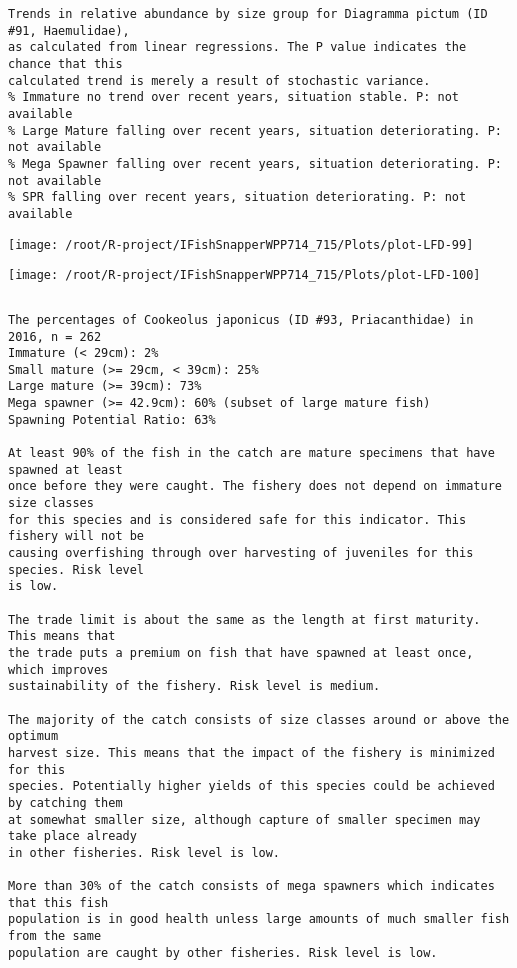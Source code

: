 \documentclass{report}\usepackage[]{graphicx}\usepackage[]{color}
\makeatletter
\def\maxwidth{ %
  \ifdim\Gin@nat@width>\linewidth
    \linewidth
  \else
    \Gin@nat@width
  \fi
}
\newenvironment{kframe}{%
 \def\at@end@of@kframe{}%
 \ifinner\ifhmode%
  \def\at@end@of@kframe{\end{minipage}}%
  \begin{minipage}{\columnwidth}%
 \fi\fi%
 \def\FrameCommand##1{\hskip\@totalleftmargin \hskip-\fboxsep
 \colorbox{shadecolor}{##1}\hskip-\fboxsep
     \hskip-\linewidth \hskip-\@totalleftmargin \hskip\columnwidth}%
 \MakeFramed {\advance\hsize-\width
   \@totalleftmargin\z@ \linewidth\hsize
   \@setminipage}}%
 {\par\unskip\endMakeFramed%
 \at@end@of@kframe}
\newenvironment{knitrout}{}{} %
\makeatother
\begin{document}
\begin{knitrout}
\begin{kframe}
\begin{verbatim}
Trends in relative abundance by size group for Diagramma pictum (ID #91, Haemulidae),
as calculated from linear regressions. The P value indicates the chance that this
calculated trend is merely a result of stochastic variance.
% Immature no trend over recent years, situation stable. P: not available
% Large Mature falling over recent years, situation deteriorating. P: not available
% Mega Spawner falling over recent years, situation deteriorating. P: not available
% SPR falling over recent years, situation deteriorating. P: not available
\end{verbatim}
\end{kframe}
\texttt{[image: /root/R-project/IFishSnapperWPP714\_715/Plots/plot-LFD-99]} 

\texttt{[image: /root/R-project/IFishSnapperWPP714\_715/Plots/plot-LFD-100]} 
\begin{kframe}\begin{verbatim}
\end{verbatim}
\end{kframe}
\clearpage
\newpage
\begin{kframe}\begin{verbatim}The percentages of Cookeolus japonicus (ID #93, Priacanthidae) in 2016, n = 262
Immature (< 29cm): 2%
Small mature (>= 29cm, < 39cm): 25%
Large mature (>= 39cm): 73%
Mega spawner (>= 42.9cm): 60% (subset of large mature fish)
Spawning Potential Ratio: 63%
 
At least 90% of the fish in the catch are mature specimens that have spawned at least
once before they were caught. The fishery does not depend on immature size classes
for this species and is considered safe for this indicator. This fishery will not be
causing overfishing through over harvesting of juveniles for this species. Risk level
is low.

The trade limit is about the same as the length at first maturity.  This means that
the trade puts a premium on fish that have spawned at least once, which improves
sustainability of the fishery. Risk level is medium.

The majority of the catch consists of size classes around or above the optimum
harvest size. This means that the impact of the fishery is minimized for this
species. Potentially higher yields of this species could be achieved by catching them
at somewhat smaller size, although capture of smaller specimen may take place already
in other fisheries. Risk level is low.

More than 30% of the catch consists of mega spawners which indicates that this fish
population is in good health unless large amounts of much smaller fish from the same
population are caught by other fisheries. Risk level is low.
 

\end{verbatim}
\end{kframe}
\end{knitrout}
\end{document}
